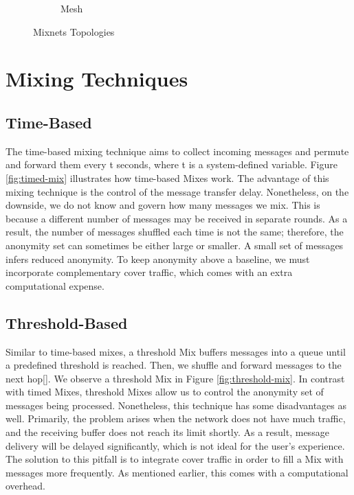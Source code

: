 \documentclass[logo,msc,cyber]{infthesis}   %
\begin{document}
\begin{figure}[h!]
\begin{subfigure}[b]{0.45\textwidth}
        \caption{Mesh}
        \label{fig:mesh}
    \end{subfigure}
       \caption{Mixnets Topologies}
       \label{fig:mixnets-topologies}
\end{figure}

\section{Mixing Techniques}

\subsection{Time-Based}
The time-based mixing technique aims to collect incoming messages and permute
and forward them every t seconds, where t is a system-defined variable. Figure
\ref{fig:timed-mix} illustrates how time-based Mixes work. The advantage of this
mixing technique is the control of the message transfer delay. Nonetheless, on
the downside, we do not know and govern how many messages we mix. This is
because a different number of messages may be received in separate rounds. As a
result, the number of messages shuffled each time is not the same; therefore,
the anonymity set can sometimes be either large or smaller. A small set of
messages infers reduced anonymity. To keep anonymity above a baseline, we must
incorporate complementary cover traffic, which comes with an extra computational
expense.

\subsection{Threshold-Based}
Similar to time-based mixes, a threshold Mix buffers messages into a queue until
a predefined threshold is reached. Then, we shuffle and forward messages to the
next hop[]. We observe a threshold Mix in Figure \ref{fig:threshold-mix}. In
contrast with timed Mixes, threshold Mixes allow us to control the anonymity set
of messages being processed. Nonetheless, this technique has some disadvantages
as well. Primarily, the problem arises when the network does not have much
traffic, and the receiving buffer does not reach its limit shortly. As a result,
message delivery will be delayed significantly, which is not ideal for the
user's experience. The solution to this pitfall is to integrate cover traffic in
order to fill a Mix with messages more frequently. As mentioned earlier, this
comes with a computational overhead. 
\end{document}
